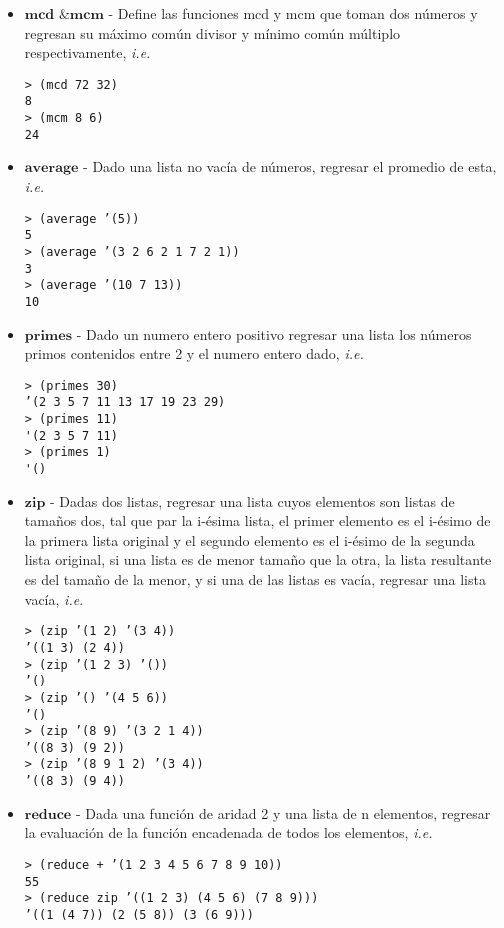 \documentclass{article}
\begin{document}
\begin{itemize}
\item $\textbf{mcd \& mcm}$ - Define las funciones mcd y mcm que
  toman dos números y regresan su máximo común divisor y mínimo común
  múltiplo respectivamente, \textit{i.e.}
\begin{verbatim}
> (mcd 72 32)
8
> (mcm 8 6)
24
\end{verbatim}

\item $\textbf{average}$ - Dado una lista no vacía de números, regresar el
  promedio de esta, \textit{i.e.}
\begin{verbatim}
> (average ’(5))
5
> (average ’(3 2 6 2 1 7 2 1))
3
> (average ’(10 7 13))
10
\end{verbatim}

\item $\textbf{primes}$ - Dado un numero entero positivo regresar una lista los
números primos contenidos entre 2 y el numero entero dado, \textit{i.e.}
\begin{verbatim}
> (primes 30)
’(2 3 5 7 11 13 17 19 23 29)
> (primes 11)
'(2 3 5 7 11)
> (primes 1)
'()
\end{verbatim}

\newpage

\item $\textbf{zip}$ - Dadas dos listas, regresar una lista cuyos elementos son
  listas de tamaños dos, tal que par la i-ésima lista, el primer
  elemento es el i-ésimo de la primera lista original y el segundo
  elemento es el i-ésimo de la segunda lista original, si una lista es
de menor tamaño que la otra, la lista resultante es del tamaño de la
menor, y si una de las listas es vacía, regresar una lista vacía,
\textit{i.e.}
\begin{verbatim}
> (zip ’(1 2) ’(3 4))
’((1 3) (2 4))
> (zip ’(1 2 3) ’())
’()
> (zip ’() ’(4 5 6))
’()
> (zip ’(8 9) ’(3 2 1 4))
’((8 3) (9 2))
> (zip ’(8 9 1 2) ’(3 4))
’((8 3) (9 4))
\end{verbatim}

\item $\textbf{reduce}$ - Dada una función de aridad 2 y una lista de
  n elementos, regresar la evaluación de la función encadenada de
  todos los elementos, \textit{i.e.}
\begin{verbatim}
> (reduce + ’(1 2 3 4 5 6 7 8 9 10))
55
> (reduce zip ’((1 2 3) (4 5 6) (7 8 9)))
’((1 (4 7)) (2 (5 8)) (3 (6 9)))
\end{verbatim}

\end{itemize}
\end{document}

